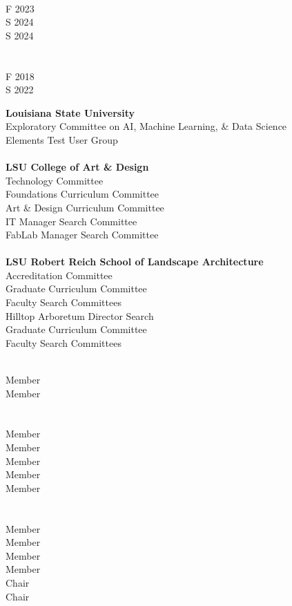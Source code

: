 \documentclass[10pt]{designcv}
\begin{document}
\hfill
\begin{minipage}[t]{0.2\textwidth}
\ \\
F 2023\\
S 2024\\
S 2024\\
\ \\
\ \\
F 2018\\
S 2022\\
\end{minipage}
\hfill



\begin{minipage}[t]{0.7\textwidth}
\raggedright
\textbf{Louisiana State University}\\
Exploratory Committee on AI, Machine Learning, \& Data Science\\
Elements Test User Group\\
\ \\
\textbf{LSU College of Art \& Design}\\
Technology Committee\\
Foundations Curriculum Committee\\
Art \& Design Curriculum Committee\\
IT Manager Search Committee\\
FabLab Manager Search Committee\\
\ \\
\textbf{LSU Robert Reich School of Landscape Architecture}\\ 
Accreditation Committee\\
Graduate Curriculum Committee\\
Faculty Search Committees\\
Hilltop Arboretum Director Search\\
Graduate Curriculum Committee\\
Faculty Search Committees\\
\end{minipage}
\hfill
\begin{minipage}[t]{0.125\textwidth} 
\ \\
Member\\
Member\\
\ \\
\ \\
Member\\
Member\\
Member\\
Member\\
Member\\
\ \\
\ \\
Member\\
Member\\
Member\\
Member\\
Chair\\
Chair\\
\end{minipage}
\end{document}
